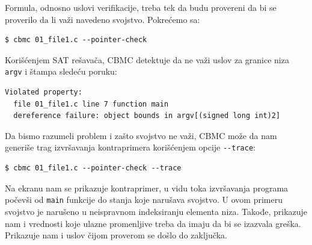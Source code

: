 Formula, odnosno uslovi verifikacije, treba tek da budu provereni da bi se proverilo da li važi navedeno svojstvo. Pokrećemo sa:

\begin{verbatim}
$ cbmc 01_file1.c --pointer-check
\end{verbatim}

Korišćenjem SAT rešavača, CBMC detektuje da ne važi uslov za granice niza \texttt{argv} i štampa sledeću poruku:

\begin{verbatim}
Violated property:
  file 01_file1.c line 7 function main
  dereference failure: object bounds in argv[(signed long int)2]
\end{verbatim}

Da bismo razumeli problem i zašto svojstvo ne važi, CBMC može da nam generiše trag izvršavanja kontraprimera korišćenjem opcije \texttt{-{}-trace}:

\begin{verbatim}
$ cbmc 01_file1.c --pointer-check --trace
\end{verbatim}

Na ekranu nam se prikazuje kontraprimer, u vidu toka izvršavanja programa počevši od \texttt{main} funkcije do stanja koje narušava svojstvo. U ovom primeru svojstvo je narušeno u neispravnom indeksiranju elementa niza. Takođe, prikazuje nam i vrednosti koje ulazne promenljive treba da imaju da bi se izazvala greška. Prikazuje nam i uslov čijom proverom se došlo do zaključka.

